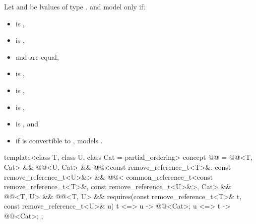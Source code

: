 \pnum
Let  and  be lvalues
of type .
 and 
model  only if:
\begin{itemize}
\item
   is ,
\item
   is ,
\item
   and  are equal,
\item
   is ,
\item
   is ,
\item
   is ,
\item
   is , and
\item
  if  is convertible to ,  models
  .
\end{itemize}

%
\begin{codeblock}
template<class T, class U, class Cat = partial_ordering>
  concept @@ =
    @@<T, Cat> &&
    @@<U, Cat> &&
    @@<const remove_reference_t<T>&, const remove_reference_t<U>&> &&
    @@<
      common_reference_t<const remove_reference_t<T>&, const remove_reference_t<U>&>, Cat> &&
    @@<T, U> &&
    @@<T, U> &&
    requires(const remove_reference_t<T>& t, const remove_reference_t<U>& u) {
      { t <=> u } -> @@<Cat>;
      { u <=> t } -> @@<Cat>;
    };
\end{codeblock}


